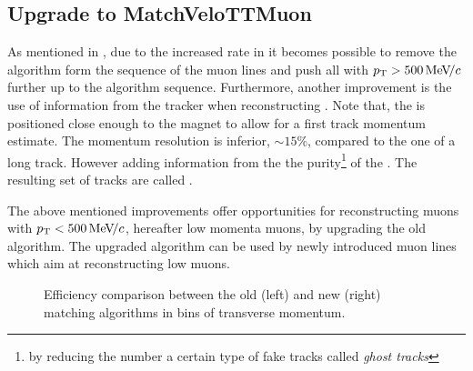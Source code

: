\subsection{Upgrade to MatchVeloTTMuon}
\label{sec:matchvelottmuon}
As mentioned in , due to the increased \hltone rate in \runtwo it becomes possible to
remove the \mvm algorithm form the sequence of the \hltone muon lines and push all \veloTracks with
$\mbox{$p_{\rm T}$}>500 {\mathrm{\,Me\kern -0.1em V\!/}c}$ further up to the \hltone algorithm sequence. Furthermore, another improvement is the use of
information from the \ttracker tracker when reconstructing \veloTracks \cite{LHCb-PUB-2015-005}.
Note that, the \ttracker is positioned close enough to the \lhcb magnet to allow for a first track momentum estimate.
The \ttracker momentum resolution is inferior, $\sim 15\%$, compared to the one of a long track. However adding
information from the \ttracker the purity\footnote{by reducing the number a certain type of fake
tracks called {\it ghost tracks}}\cite{Bowen:2105078} of the \veloTracks. The resulting set of
tracks are called \veloTTracks.

The above mentioned improvements offer opportunities for reconstructing muons with $\mbox{$p_{\rm T}$}<500 {\mathrm{\,Me\kern -0.1em V\!/}c}$,
hereafter low momenta muons, by upgrading the old \mvm algorithm. The upgraded algorithm can be
used by newly introduced \hltone muon lines which aim at reconstructing low \pt muons.

\begin{figure}[t]
  \centering
  \begin{subfigure}{0.5\textwidth}
    \raggedright
    \scalebox{.6}{}
    \caption{}
    \label{mvTTm_eff_p}
  \end{subfigure}%
  \hfill%
  \begin{subfigure}{0.5\textwidth}
    \raggedleft
    \scalebox{.6}{}
    \caption{}
    \label{mvm_eff_p}
  \end{subfigure}
  \caption{Efficiency comparison between the old (left) and new (right) matching algorithms in bins of transverse momentum.}
 \label{mvm_eff_pt_zoom_comp}
\end{figure}

